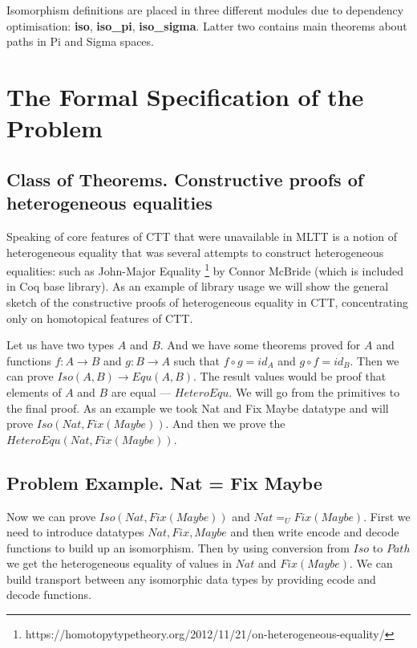 \documentclass{article}
\begin{document}
Isomorphism definitions are placed in three different modules due to dependency
optimisation: {\bf iso}, {\bf iso\_pi}, {\bf iso\_sigma}. Latter two contains
main theorems about paths in Pi and Sigma spaces.

\section{The Formal Specification of the Problem}

\subsection{Class of Theorems. Constructive proofs of heterogeneous equalities}

Speaking of core features of CTT that were unavailable in MLTT is a notion
of heterogeneous equality that was several attempts to construct heterogeneous equalities:
such as John-Major Equality \footnote{https://homotopytypetheory.org/2012/11/21/on-heterogeneous-equality/}
by Connor McBride (which is included in Coq base library). As an example of library usage
we will show the general sketch of the constructive proofs of heterogeneous equality in CTT,
concentrating only on homotopical features of CTT.

Let us have two types $A$ and $B$. And we have some theorems proved for $A$ and functions
$f: A \rightarrow B$ and $g: B \rightarrow A$ such that $f \circ g = id_A$ and $g \circ f = id_B$. Then we
can prove $Iso(A,B) \rightarrow Equ(A,B)$. The result values would be proof that
elements of $A$ and $B$ are equal --- $HeteroEqu$. We will go from the primitives to the final proof.
As an example we took Nat and Fix Maybe datatype and will prove $Iso(Nat,Fix(Maybe))$.
And then we prove the $HeteroEqu(Nat,Fix(Maybe))$.

\subsection{Problem Example. Nat = Fix Maybe}

Now we can prove $Iso(Nat, Fix(Maybe))$ and $Nat =_U Fix(Maybe)$.
First we need to introduce datatypes $Nat, Fix, Maybe$ and then write encode and decode
functions to build up an isomorphism. Then by using conversion
from $Iso$ to $Path$ we get the heterogeneous equality of values in $Nat$ and $Fix(Maybe)$.
We can build transport between any isomorphic data types by providing ecode and decode functions.
\end{document}
